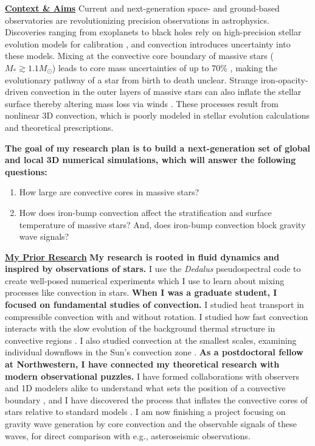 \documentclass[12pt]{article}
\newcommand{\sct}[1]{\vspace{0.3cm}\hspace{-\parindent}\textbf{\underline{#1}}\hspace{0.3cm}}
\begin{document}
\thispagestyle{fancy}

\sct{Context \& Aims}
Current and next-generation space- and ground-based observatories are revolutionizing precision observations in astrophysics.
Discoveries ranging from exoplanets to black holes rely on high-precision stellar evolution models for calibration \citep{mesa6}, and convection introduces uncertainty into these models.
Mixing at the convective core boundary of massive stars ($M_* \gtrsim 1.1 M_\odot$) leads to core mass uncertainties of up to 70\% \citep{kaiser_etal_2020}, making the evolutionary pathway of a star from birth to death unclear.
Strange iron-opacity-driven convection in the outer layers of massive stars can also inflate the stellar surface thereby altering mass loss via winds \citep{kohler_etal_2015}.
These processes result from nonlinear 3D convection, which is poorly modeled in stellar evolution calculations and theoretical prescriptions.


\textbf{The goal of my research plan is to build a next-generation set of global and local 3D numerical simulations, which will answer the following questions:}\vspace{-0.2cm}
\begin{enumerate}
    \item How large are convective cores in massive stars? \vspace{-0.2cm}
    \item How does iron-bump convection affect the stratification and surface temperature of massive stars?
        And, does iron-bump convection block gravity wave signals?
\end{enumerate}

\sct{My Prior Research}
\textbf{My research is rooted in fluid dynamics and inspired by observations of stars.}
I use the \emph{Dedalus} \citep{burns_etal_2020} pseudospectral code to create well-posed numerical experiments which I use to learn about mixing processes like convection in stars.
\textbf{When I was a graduate student, I focused on fundamental studies of convection.}
I studied heat transport in compressible convection with  \citep{anders_etal_2019_rot} and without \citep{anders_brown_2017} rotation.
I studied how fast convection interacts with the slow evolution of the background thermal structure in convective regions \citep{anders_etal_2018,anders_etal_2020}.
I also studied convection at the smallest scales, examining individual downflows in the Sun's convection zone \cite{anders_etal_2019_thermals}.
\textbf{As a postdoctoral fellow at Northwestern, I have connected my theoretical research with modern observational puzzles.}
I have formed collaborations with observers and 1D modelers alike to understand what sets the position of a convective boundary \citep{anders_etal_2022b}, and I have discovered the process that inflates the convective cores of stars relative to standard models \citep{anders_etal_2022a}.
I am now finishing a project focusing on gravity wave generation by core convection and the observable signals of these waves, for direct comparison with e.g., asteroseismic observations.
\end{document}

